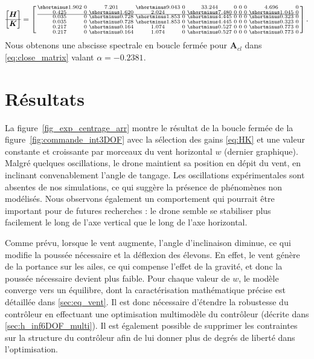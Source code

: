 \begin{align}\label{eq:HK}
\begin{bmatrix}
    \boldsymbol{H}\\ \hline \boldsymbol{K }
\end{bmatrix} = \smallmat{
\shortminus1.902 & 0 & 7.201 & \shortminus9.043  & 0 & 33.244 & 0 & 0 & 0 & 4.696  & 0 \\ 
0.425 & 0 & \shortminus1.620 & 2.024  & 0 & \shortminus7.480 & 0 & 0 & 0 & \shortminus1.045  & 0 \\  \hline
0.035 & 0 & \shortminus0.728 & \shortminus1.853  & 0 & \shortminus4.445 & 0 & 0 & 0 & \shortminus0.323  & 0 \\ 
0.035 & 0 & \shortminus0.728 & \shortminus1.853  & 0 & \shortminus4.445 & 0 & 0 & 0 & \shortminus0.323  & 0 \\ 
0.217  & 0 & \shortminus0.164  & 1.074 & 0 & \shortminus0.527 & 0 & 0 & 0 & \shortminus0.773 & 0 \\ 
0.217  & 0 & \shortminus0.164  & 1.074 & 0 & \shortminus0.527 & 0 & 0 & 0 & \shortminus0.773 & 0  
}.
\end{align}
Nous obtenons une abscisse spectrale en boucle fermée pour $\boldsymbol{A}_{cl}$ dans \eqref{eq:close_matrix} valant $\alpha = -0.2381$.

\section{Résultats}
\label{sec:exp3DOF}
La figure~\ref{fig_exp_centrage_arr} montre le résultat de la boucle fermée de la figure~\ref{fig:commande_int3DOF} avec la sélection des gains \eqref{eq:HK} et une valeur constante et croissante par morceaux du vent horizontal $w$ (dernier graphique). 
Malgré quelques oscillations, le drone maintient sa position en dépit du vent, en inclinant convenablement l'angle de tangage. Les oscillations expérimentales sont absentes de nos simulations, ce qui suggère la présence de phénomènes non modélisés.
Nous observons également un comportement qui pourrait être important pour de futures recherches : le drone semble se stabiliser plus facilement le long de l'axe vertical que le long de l'axe horizontal. 

Comme prévu, lorsque le vent augmente, l'angle d'inclinaison diminue, ce qui modifie la poussée nécessaire et la déflexion des élevons. En effet, le vent génère de la portance sur les ailes, ce qui compense l'effet de la gravité, et donc la poussée nécessaire devient plus faible.
Pour chaque valeur de $w$, le modèle converge vers un équilibre, dont la caractérisation mathématique précise est détaillée dans \ref{sec:eq_vent}. Il est donc nécessaire d'étendre la robustesse du contrôleur en effectuant une optimisation multimodèle du contrôleur (décrite dans \ref{sec:h_inf6DOF_multi}). Il est également possible de supprimer les contraintes sur la structure du contrôleur afin de lui donner plus de degrés de liberté dans l'optimisation.

